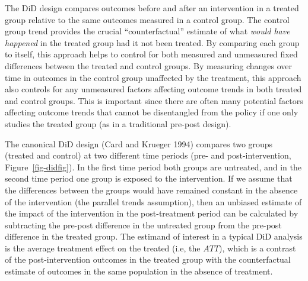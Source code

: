 \documentclass[
  letterpaper,
  DIV=11,
  numbers=noendperiod]{scrartcl}
\begin{document}
The DiD design compares outcomes before and after an intervention in a
treated group relative to the same outcomes measured in a control group.
The control group trend provides the crucial ``counterfactual'' estimate
of what \emph{would have happened} in the treated group had it not been
treated. By comparing each group to itself, this approach helps to
control for both measured and unmeasured fixed differences between the
treated and control groups. By measuring changes over time in outcomes
in the control group unaffected by the treatment, this approach also
controls for any unmeasured factors affecting outcome trends in both
treated and control groups. This is important since there are often many
potential factors affecting outcome trends that cannot be disentangled
from the policy if one only studies the treated group (as in a
traditional pre-post design).

The canonical DiD design (Card and Krueger 1994) compares two groups
(treated and control) at two different time periods (pre- and
post-intervention, Figure~\ref{fig-didfig}). In the first time period
both groups are untreated, and in the second time period one group is
exposed to the intervention. If we assume that the differences between
the groups would have remained constant in the absence of the
intervention (the parallel trends assumption), then an unbiased estimate
of the impact of the intervention in the post-treatment period can be
calculated by subtracting the pre-post difference in the untreated group
from the pre-post difference in the treated group. The estimand of
interest in a typical DiD analysis is the average treatment effect on
the treated (i.e, the \(ATT\)), which is a contrast of the
post-intervention outcomes in the treated group with the counterfactual
estimate of outcomes in the same population in the absence of treatment.
\end{document}
